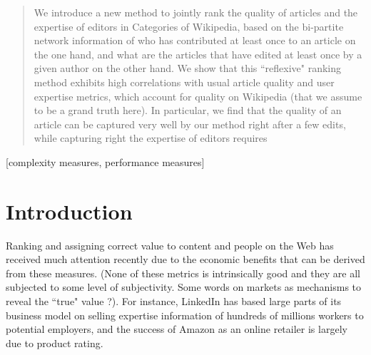 \documentclass{acm_proc_article-sp}
\begin{document}
\date{23 February 2014}

\maketitle
\begin{abstract}
We introduce a new method to jointly rank the quality of articles and the expertise of editors in Categories of Wikipedia, based on the bi-partite network information of who has contributed at least once to an article on the one hand, and what are the articles that have edited at least once by a given author on the other hand. We show that this ``reflexive" ranking method exhibits high correlations with usual article quality and user expertise metrics, which account for quality on Wikipedia (that we assume to be a grand truth here). In particular, we find that the quality of an article can be captured very well by our method right after a few edits, while capturing right the expertise of editors requires 
\end{abstract}

[complexity measures, performance measures]



\section{Introduction}


Ranking and assigning correct value to content and people on the Web has received much attention recently due to the economic benefits that can be derived from these measures. (None of these metrics is intrinsically good and they are all subjected to some level of subjectivity. Some words on markets as mechanisms to reveal the ``true" value ?). For instance, LinkedIn has based large parts of its business model on selling expertise information of hundreds of millions workers to potential employers, and the success of Amazon as an online retailer is largely due to product rating. 
\end{document}
